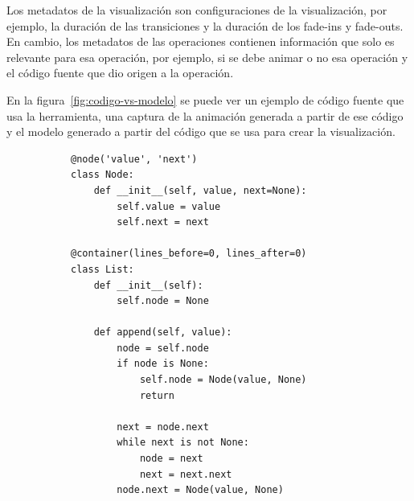 Los metadatos de la visualización son configuraciones de la visualización, por ejemplo, la duración de las transiciones y la duración de los fade-ins y fade-outs. En cambio, los metadatos de las operaciones contienen información que solo es relevante para esa operación, por ejemplo, si se debe animar o no esa operación y el código fuente que dio origen a la operación.

En la figura~\ref{fig:codigo-vs-modelo} se puede ver un ejemplo de código fuente que usa la herramienta, una captura de la animación generada a partir de ese código y el modelo generado a partir del código que se usa para crear la visualización.

\begin{figure}[p]
    \centering
    \begin{subfigure}[b]{0.49\textwidth}
        \centering
        \begin{verbatim}
@node('value', 'next')
class Node:
    def __init__(self, value, next=None):
        self.value = value
        self.next = next

@container(lines_before=0, lines_after=0)
class List:
    def __init__(self):
        self.node = None
        
    def append(self, value):
        node = self.node
        if node is None:
            self.node = Node(value, None)
            return

        next = node.next
        while next is not None:
            node = next
            next = next.next
        node.next = Node(value, None)


\end{verbatim}
\end{subfigure}
\end{figure}
